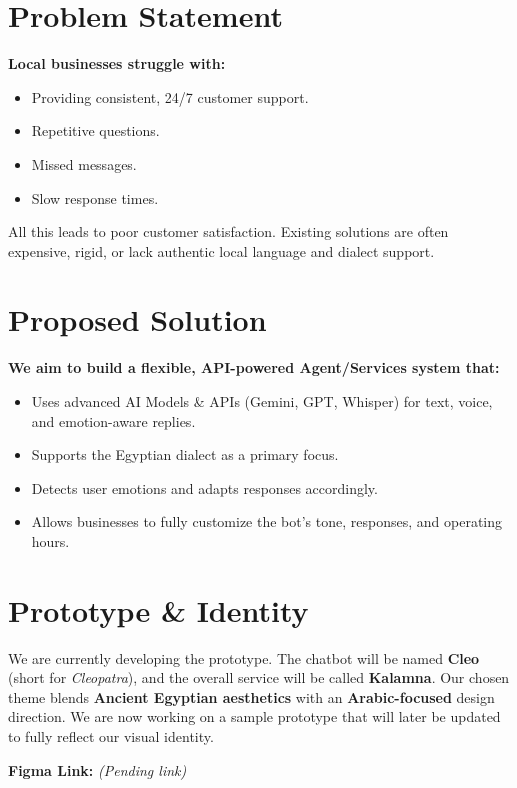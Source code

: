 \documentclass[12pt,a4paper]{article}
\begin{document}
\section{Problem Statement}
\textbf{Local businesses struggle with:}
\begin{itemize}[noitemsep]
    \item Providing consistent, 24/7 customer support.
    \item Repetitive questions.
    \item Missed messages.
    \item Slow response times.
\end{itemize}

All this leads to poor customer satisfaction. Existing solutions are often expensive, rigid, or lack authentic local language and dialect support.

\section{Proposed Solution}
\textbf{We aim to build a flexible, API-powered Agent/Services system that:}
\begin{itemize}[noitemsep]
    \item Uses advanced AI Models \& APIs (Gemini, GPT, Whisper) for text, voice, and emotion-aware replies.
    \item Supports the Egyptian dialect as a primary focus.
    \item Detects user emotions and adapts responses accordingly.
    \item Allows businesses to fully customize the bot’s tone, responses, and operating hours.
\end{itemize}
\section{Prototype \& Identity}
We are currently developing the prototype. The chatbot will be named \textbf{Cleo} (short for \textit{Cleopatra}), and the overall service will be called \textbf{Kalamna}.  
Our chosen theme blends \textbf{Ancient Egyptian aesthetics} with an \textbf{Arabic-focused} design direction.  
We are now working on a sample prototype that will later be updated to fully reflect our visual identity.

\textbf{Figma Link:} \textit{(Pending link)}
\end{document}
